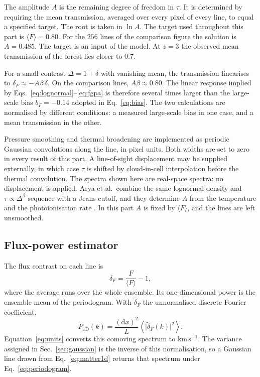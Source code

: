 \documentclass[11pt]{article}
\begin{document}
The amplitude $A$ is the remaining degree of freedom in $\tau$.
It is determined by requiring the mean transmission, averaged over every pixel of every line, to equal a specified target.
The root is taken in $\ln A$.
The target used throughout this part is $\langle F\rangle = 0.80$.
For the $256$ lines of the comparison figure the solution is $A=0.485$.
The target is an input of the model.
At $z=3$ the observed mean transmission of the forest lies closer to $0.7$.

For a small contrast $\Delta=1+\delta$ with vanishing mean, the transmission linearises to $\delta_F \approx -A\beta\,\delta$.
On the comparison lines, $A\beta \approx 0.80$.
The linear response implied by Eqs.~\eqref{eq:lognormal}--\eqref{eq:fgpa} is therefore several times larger than the large-scale bias $b_F=-0.14$ adopted in Eq.~\eqref{eq:bias}.
The two calculations are normalised by different conditions: a measured large-scale bias in one case, and a mean transmission in the other.

Pressure smoothing and thermal broadening are implemented as periodic Gaussian convolutions along the line, in pixel units.
Both widths are set to zero in every result of this part.
A line-of-sight displacement may be supplied externally, in which case $\tau$ is shifted by cloud-in-cell interpolation before the thermal convolution.
The spectra shown here are real-space spectra: no displacement is applied.
Arya et al.\ combine the same lognormal density and $\tau\propto\Delta^{\beta}$ sequence with a Jeans cutoff, and they determine $A$ from the temperature and the photoionisation rate \citep{Arya:2022uke}.
In this part $A$ is fixed by $\langle F\rangle$, and the lines are left unsmoothed.

\subsection{Flux-power estimator}
\label{sec:estimator}

The flux contrast on each line is
\begin{equation}
\label{eq:deltaf}
\delta_F = \frac{F}{\langle F\rangle} - 1,
\end{equation}
where the average runs over the whole ensemble.
Its one-dimensional power is the ensemble mean of the periodogram.
With $\tilde\delta_F$ the unnormalised discrete Fourier coefficient,
\begin{equation}
\label{eq:periodogram}
P_{1\mathrm{D}}(k)
=
\frac{(\mathrm{d}x)^{2}}{L}
\left\langle \bigl|\tilde\delta_F(k)\bigr|^{2} \right\rangle.
\end{equation}
Equation~\eqref{eq:units} converts this comoving spectrum to $\mathrm{km\,s}^{-1}$.
The variance assigned in Sec.~\ref{sec:gaussian} is the inverse of this normalisation, so a Gaussian line drawn from Eq.~\eqref{eq:matter1d} returns that spectrum under Eq.~\eqref{eq:periodogram}.
\end{document}

